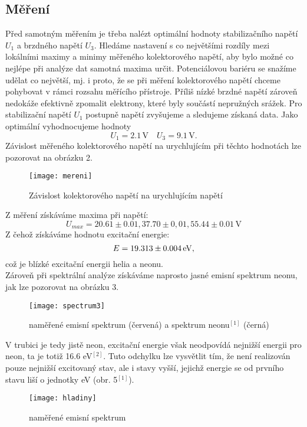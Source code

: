\documentclass[czech,11pt,a4paper]{article}
\begin{document}
\begin{multicols}{2}
		\section{Měření}
		Před samotným měřením je třeba nalézt optimální hodnoty stabilizačního napětí $U_1$ a brzdného napětí $U_3$. Hledáme nastavení s co největšími rozdíly mezi lokálními maximy a minimy měřeného kolektorového napětí, aby bylo možné co nejlépe při analýze dat samotná maxima určit. Potenciálovou bariéru se snažíme udělat co největší, mj. i proto, že se při měření kolektorového napětí chceme pohybovat v rámci rozsahu měřícího přístroje. Příliš nízké brzdné napětí zároveň nedokáže efektivně zpomalit elektrony, které byly součástí nepružných srážek. Pro stabilizační napětí $U_1$ postupně napětí zvyšujeme a sledujeme získaná data. Jako optimální vyhodnocujeme hodnoty
		\begin{equation*}
			U_1 = 2.1 \,\mathrm{V} \quad U_3 = 9.1 \,\mathrm{V}.
		\end{equation*}
		Závislost měřeného kolektorového napětí na urychlujícím při těchto hodnotách lze pozorovat na obrázku 2.
		
		\begin{figure}[H]
			\centering
			\texttt{[image: mereni]}
			\caption{Závislost kolektorového napětí na urychlujícím napětí}
			\label{fig:mereni}
		\end{figure}
		Z měření získáváme maxima při napětí:
		\begin{equation*}
			U_{max} = 20.61\pm 0.01, 37.70\pm0,01, 55.44 \pm 0.01\,\mathrm{V}
		\end{equation*}
		Z čehož získáváme hodnotu excitační energie:
		\begin{equation}
			E = 19.313 \pm 0.004 \,\rm eV,
		\end{equation}
		což je blízké excitační energii helia a neonu.\\
		Zároveň při spektrální analýze získáváme naprosto jasné emisní spektrum neonu, jak lze pozorovat na obrázku 3.
		\begin{figure}[H]
			\centering
			\texttt{[image: spectrum3]}
			\caption{naměřené emisní spektrum (červená) a spektrum neonu$^{[1]}$ (černá)}
		\end{figure}
		V trubici je tedy jistě neon, excitační energie však neodpovídá nejnižší energii pro neon, ta je totiž 16.6 eV$^{[2]}$.
		Tuto odchylku lze vysvětlit tím, že není realizován pouze nejnižší excitovaný stav, ale i stavy vyšší, jejichž energie se od prvního stavu liší o jednotky eV (obr. 5$^{[1]}$).
			\begin{figure}[H]
			\centering
			\texttt{[image: hladiny]}
			\caption{naměřené emisní spektrum}
		\end{figure}
		

\end{multicols}
\end{document}
